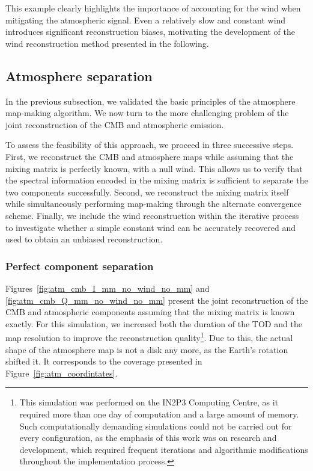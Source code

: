 \documentclass[a4paper,11pt]{article}
\begin{document}
This example clearly highlights the importance of accounting for the wind when mitigating the atmospheric signal. Even a relatively slow and constant wind introduces significant reconstruction biases, motivating the development of the wind reconstruction method presented in the following.

\subsection{Atmosphere separation}

In the previous subsection, we validated the basic principles of the atmosphere map-making algorithm. We now turn to the more challenging problem of the joint reconstruction of the CMB and atmospheric emission.

To assess the feasibility of this approach, we proceed in three successive steps. First, we reconstruct the CMB and atmosphere maps while assuming that the mixing matrix is perfectly known, with a null wind. This allows us to verify that the spectral information encoded in the mixing matrix is sufficient to separate the two components successfully. Second, we reconstruct the mixing matrix itself while simultaneously performing map-making through the alternate convergence scheme. Finally, we include the wind reconstruction within the iterative process to investigate whether a simple constant wind can be accurately recovered and used to obtain an unbiased reconstruction.

\subsubsection{Perfect component separation}

Figures~\ref{fig:atm_cmb_I_mm_no_wind_no_mm} and \ref{fig:atm_cmb_Q_mm_no_wind_no_mm} present the joint reconstruction of the CMB and atmospheric components assuming that the mixing matrix is known exactly. For this simulation, we increased both the duration of the TOD and the map resolution to improve the reconstruction quality\footnote{This simulation was performed on the IN2P3 Computing Centre, as it required more than one day of computation and a large amount of memory. Such computationally demanding simulations could not be carried out for every configuration, as the emphasis of this work was on research and development, which required frequent iterations and algorithmic modifications throughout the implementation process.}. Due to this, the actual shape of the atmosphere map is not a disk any more, as the Earth's rotation shifted it. It corresponds to the coverage presented in Figure~\ref{fig:atm_coordintates}.
\end{document}
